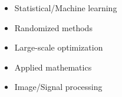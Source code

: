 \documentclass[letterpaper]{article}
\begin{document}
\begin{minipage}[t]{1\linewidth}
\begin{minipage}[t]{0.5\linewidth}
\begin{minipage}{1\linewidth}
\begin{minipage}{1\linewidth}
{			\begin{itemize}
				\item  Statistical/Machine learning
				\item  Randomized methods
				\item  Large-scale optimization
				\item  Applied mathematics
				\item  Image/Signal processing
			\end{itemize}
			}
		\end{minipage}
	\end{minipage} %
\end{minipage}
\end{minipage}
\end{document}
